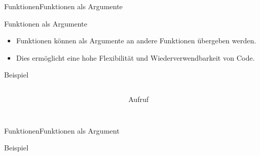 \documentclass[xelatex,aspectratio=169]{beamer}
\begin{document}
\begin{frame}{Funktionen}{Funktionen als Argumente}
    \begin{block}{Funktionen als Argumente}
        \begin{itemize}
            \item Funktionen können als Argumente an andere Funktionen übergeben werden.
            \item Dies ermöglicht eine hohe Flexibilität und Wiederverwendbarkeit von Code.
        \end{itemize}
    \end{block}
    \begin{exampleblock}{Beispiel}
        \begin{columns}[onlytextwidth]
            \begin{column}{0.55\textwidth}
                \inputminted[firstline=1,lastline=7]{python}{src/functions_as_argument.py}
            \end{column}
            \begin{column}{0.42\textwidth}
                \begin{center}
                    Aufruf
                \end{center}
                \inputminted[firstline=10]{python}{src/functions_as_argument.py}
            \end{column}
        \end{columns}
    \end{exampleblock}

\end{frame}

\begin{frame}{Funktionen}{Funktionen als Argument}
    \begin{exampleblock}{Beispiel}
        \begin{columns}[onlytextwidth,T]
            \begin{column}{0.4\textwidth}
                \inputminted[firstline=1,lastline=10]{python}{src/functions_as_arguments_listmap.py}
            \end{column}
            \begin{column}{0.55\textwidth}
                \inputminted[firstline=13,lastline=22]{python}{src/functions_as_arguments_listmap.py}
            \end{column}
        \end{columns}
    \end{exampleblock}
\end{frame}
\end{document}
